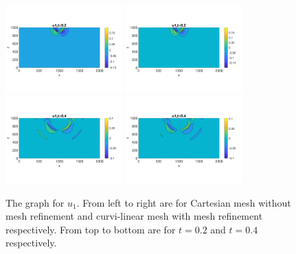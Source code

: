 \begin{figure}[htbp]
	\centering
	\includegraphics[width=0.4\textwidth,trim={0 2.8cm 0 2.8cm}, clip]{u1_t02_cartesian.png}
	\includegraphics[width=0.4\textwidth,trim={0 2.8cm 0 2.8cm}, clip]{u1_t02_curvi_mr.png}\\
	\includegraphics[width=0.4\textwidth,trim={0 2.8cm 0 2.8cm}, clip]{u1_t04_cartesian.png}
	\includegraphics[width=0.4\textwidth,trim={0 2.8cm 0 2.8cm}, clip]{u1_t04_curvi_mr.png}
	\caption{The graph for $u_1$. From left to right are for Cartesian mesh without mesh refinement and curvi-linear mesh with mesh refinement respectively. From top to bottom are for $t = 0.2$ and $t = 0.4$ respectively.}\label{u1}
\end{figure}

